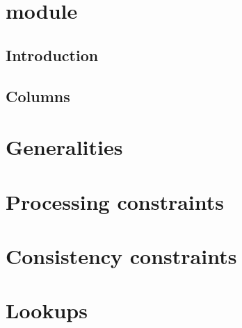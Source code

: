 
\section{\blockHashMod{} module}
\subsection{Introduction}                    \label{block hash: intro}                    
\subsection{Columns}                         \label{block hash: columns}                  

\section{Generalities}                       \label{block hash: generalities}             
\section{Processing constraints}             \label{block hash: processing}               
\section{Consistency constraints}            \label{block hash: consistency}              
\section{Lookups}                            \label{block hash  lookups}                  
